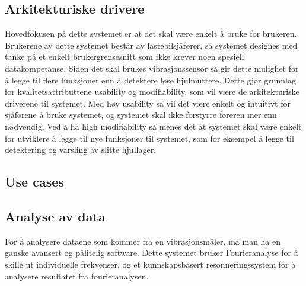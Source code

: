\subsection{Arkitekturiske drivere}
Hovedfokusen på dette systemet er at det skal være enkelt å bruke for brukeren. 
Brukerene av dette systemet består av lastebilsjåfører, så systemet designes med tanke på et enkelt brukergrensesnitt som ikke krever noen spesiell datakompetanse. 
Siden det skal brukes vibrasjonssensor så gir dette mulighet for å legge til flere funksjoner enn å detektere løse hjulmuttere. 
Dette gjør grunnlag for kvalitetsattributtene usability og modifiability, som vil være de arkitekturiske driverene til systemet. 
Med høy usability så vil det være enkelt og intuitivt for sjåførene å bruke systemet, og systemet skal ikke forstyrre føreren mer enn nødvendig. 
Ved å ha high modifiability så menes det at systemet skal være enkelt for utviklere å legge til nye funksjoner til systemet, som for eksempel å legge til detektering og varsling av slitte hjullager.

\subsection{Use cases}


\subsection{Analyse av data}
For å analysere dataene som kommer fra en vibrasjonsmåler, må man ha en ganske avansert og pålitelig software. Dette systemet bruker Fourieranalyse for å skille ut individuelle frekvenser, og et kunnskapsbasert resonneringssystem for å analysere resultatet fra fourieranalysen.



